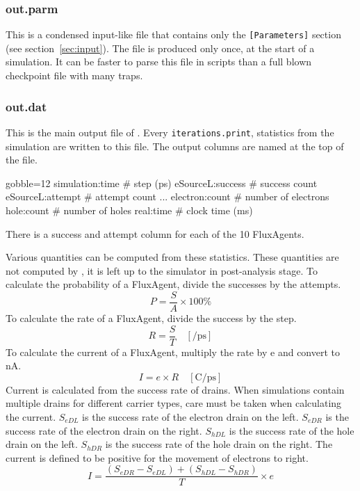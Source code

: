     \subsubsection{out.parm}
        This is a condensed input-like file that contains only the
            \verb|[Parameters]| section (see section~\ref{sec:input}).
        The file is produced only once, at the start of a simulation.
        It can be faster to parse this file in scripts than a full blown
            checkpoint file with many traps.

    \subsubsection{out.dat}
        This is the main output file of \Langmuir.
        Every \texttt{iterations.print}, statistics from the simulation are
            written to this file.
        The output columns are named at the top of the file.
        \begin{bashcode*}{gobble=12}
            simulation:time  # step (ps)
            eSourceL:success # success count
            eSourceL:attempt # attempt count
            ...
            electron:count   # number of electrons
            hole:count       # number of holes
            real:time        # clock time (ms)
        \end{bashcode*}
        There is a success and attempt column for each of the 10 FluxAgents.
        
        Various quantities can be computed from these statistics.
        These quantities are not computed by \Langmuir, it is left up to the
            simulator in post-analysis stage.
        To calculate the probability of a FluxAgent, divide the successes by
            the attempts.
        \begin{equation}
            P = \frac{S}{A} \times 100\%
        \end{equation}
        To calculate the rate of a FluxAgent, divide the success by the step.
        \begin{equation}
            R = \frac{S}{T} \quad[\si{\per\pico\second}]
        \end{equation}
        To calculate the current of a FluxAgent, multiply the rate by e and
            convert to nA.
        \begin{equation}
            I = e \times R \quad[\si{\coulomb\per\pico\second}]
        \end{equation}
        Current is calculated from the success rate of drains.
        When simulations contain multiple drains for different carrier types,
            care must be taken when calculating the current.
        $S_{eDL}$ is the success rate of the electron drain on the left.
        $S_{eDR}$ is the success rate of the electron drain on the right.
        $S_{hDL}$ is the success rate of the hole drain on the left.
        $S_{hDR}$ is the success rate of the hole drain on the right.
        The current is defined to be positive for the movement of electrons to
            right.
        \begin{equation}
            I = \frac{(S_{eDR} - S_{eDL}) + (S_{hDL} - S_{hDR})}{T} \times e
        \end{equation}
        
